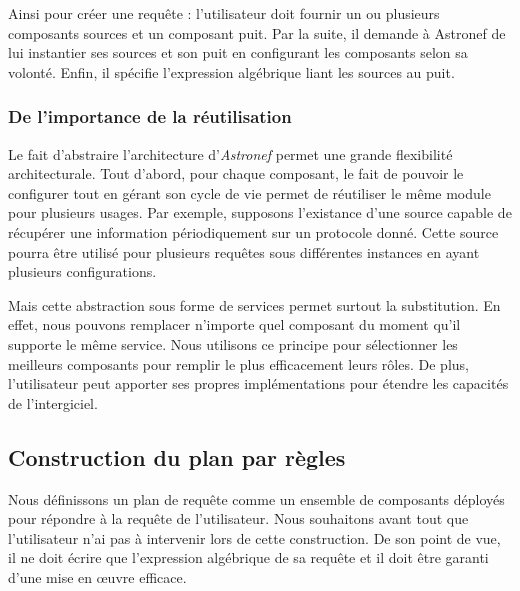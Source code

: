 Ainsi pour créer une requête : l'utilisateur doit fournir un ou plusieurs composants sources et un composant puit. Par la suite, il demande à Astronef de lui instantier ses sources et son puit en configurant les composants selon sa volonté. Enfin, il spécifie l'expression algébrique liant les sources au puit.

\subsubsection{De l'importance de la réutilisation}
Le fait d'abstraire l'architecture d'\textit{Astronef} permet une grande flexibilité architecturale. Tout d'abord, pour chaque composant, le fait de pouvoir le configurer tout en gérant son cycle de vie permet de réutiliser le même module pour plusieurs usages. Par exemple, supposons l'existance d'une source capable de récupérer une information périodiquement sur un protocole donné. Cette source pourra être utilisé pour plusieurs requêtes sous différentes instances en ayant plusieurs configurations.

Mais cette abstraction sous forme de services permet surtout la substitution. En effet, nous pouvons remplacer n'importe quel composant du moment qu'il supporte le même service. Nous utilisons ce principe pour sélectionner les meilleurs composants pour remplir le plus efficacement leurs rôles. De plus, l'utilisateur peut apporter ses propres implémentations pour étendre les capacités de l'intergiciel.

\subsection{Construction du plan par règles}
Nous définissons un plan de requête comme un ensemble de composants déployés pour répondre à la requête de l'utilisateur. Nous souhaitons avant tout que l'utilisateur n'ai pas à intervenir lors de cette construction. De son point de vue, il ne doit écrire que l'expression algébrique de sa requête et il doit être garanti d'une mise en œuvre efficace.

